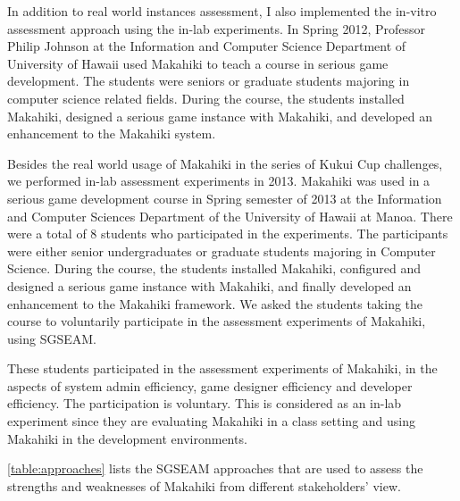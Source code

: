 In addition to real world instances assessment, I also implemented the in-vitro assessment approach using the in-lab experiments. In Spring 2012, Professor Philip Johnson at the Information and Computer Science Department of University of Hawaii used Makahiki to teach a course in serious game development. The students were seniors or graduate students majoring in computer science related fields. During the course, the students installed Makahiki, designed a serious game instance with Makahiki, and developed an enhancement to the Makahiki system.

Besides the real world usage of Makahiki in the series of Kukui Cup challenges, we
performed in-lab assessment experiments in 2013. Makahiki was used in a serious game
development course in Spring semester of 2013 at the Information and Computer Sciences
Department of the University of Hawaii at Manoa. There were a total of 8 students who
participated in the experiments.  The participants were either senior undergraduates or
graduate students majoring in Computer Science. During the course, the students installed
Makahiki, configured and designed a serious game instance with Makahiki, and finally
developed an enhancement to the Makahiki framework. We asked the students taking the
course to voluntarily participate in the assessment experiments of Makahiki, using SGSEAM.

These students participated in the assessment experiments of Makahiki, in the aspects of system admin efficiency, game designer efficiency and developer efficiency. The participation is voluntary. This is considered as an in-lab experiment since they are evaluating Makahiki in a class setting and using Makahiki in the development environments.

\autoref{table:approaches} lists the SGSEAM approaches that are used to assess the strengths and weaknesses of Makahiki from different stakeholders' view.


